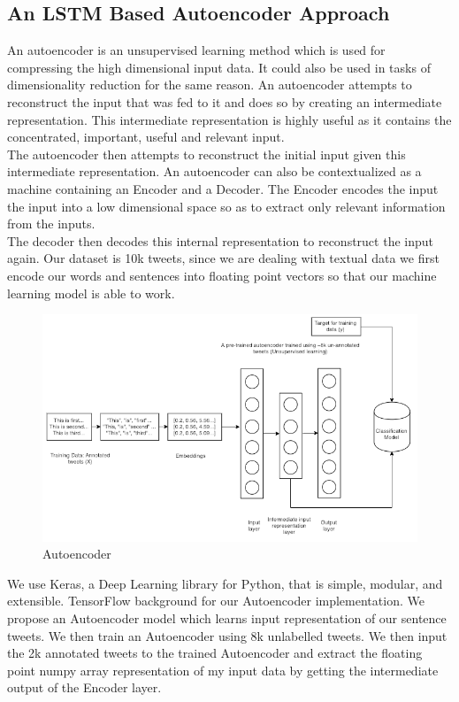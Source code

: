 \documentclass[a4paper,11pt]{article}
\begin{document}
\subsection{An LSTM Based Autoencoder Approach}
An autoencoder is an unsupervised learning method which is used for compressing the high dimensional input data. It could also be used in tasks of dimensionality reduction for the same reason.
An autoencoder attempts to reconstruct the input that was fed to it and does so by creating an intermediate representation. This intermediate representation is highly useful as it contains the concentrated, important, useful and relevant input.
\medskip\\
The autoencoder then attempts to reconstruct the initial input given this intermediate representation. An autoencoder can also be contextualized as a machine containing an Encoder and a Decoder. The Encoder encodes the input the input into a low dimensional space so as to extract only relevant information from the inputs.
\medskip\\
The decoder then decodes this internal representation to reconstruct the input again.
Our dataset is 10k tweets, since we are dealing with textual data we first encode our words and sentences into floating point vectors so that our machine learning model is able to work.\medskip\\
\begin{figure}[h]
    \centering
    \includegraphics[width=\linewidth]{ae2.png}
    \caption{Autoencoder}
    \label{fig:my_label}
\end{figure}
We use Keras, a Deep Learning library for Python, that is simple, modular, and extensible. TensorFlow background for our Autoencoder implementation. We propose an Autoencoder model which learns input representation of our sentence tweets. We then train an Autoencoder using 8k unlabelled tweets. We then input the 2k annotated tweets to the trained Autoencoder and extract the floating point numpy array representation of my input data by getting the intermediate output of the Encoder layer.
\medskip\\
\end{document}
